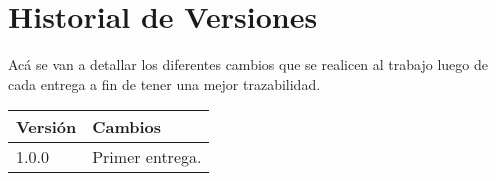 \section*{Historial de Versiones}
Acá se van a detallar los diferentes cambios que se realicen al trabajo luego
de cada entrega a fin de tener una mejor trazabilidad.
\begin{center}
  \begin{tabular}{||p{2cm} p{10cm}||} 
    \hline
    Versión & Cambios \\ [0.5ex] 
    \hline\hline
    1.0.0 & Primer entrega. \\ [0.5ex]
    \hline
  \end{tabular}
\end{center}
\newpage

